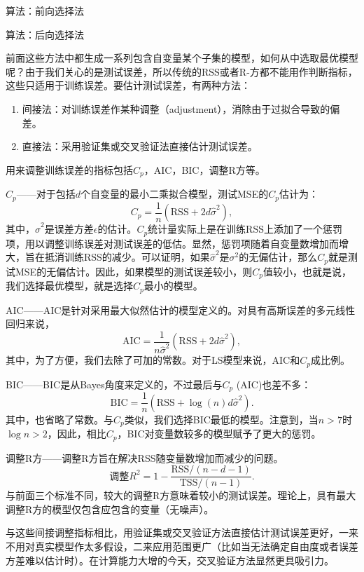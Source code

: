 \documentclass[hyperref,]{ctexart}
\providecommand{\tightlist}{%
  \setlength{\itemsep}{0pt}\setlength{\parskip}{0pt}}
\begin{document}
算法：前向选择法

算法：后向选择法

前面这些方法中都生成一系列包含自变量某个子集的模型，如何从中选取最优模型呢？由于我们关心的是测试误差，所以传统的RSS或者R-方都不能用作判断指标，这些只适用于训练误差。要估计测试误差，有两种方法：

\begin{enumerate}
\def\labelenumi{\arabic{enumi}.}
\tightlist
\item
  间接法：对训练误差作某种调整（adjustment），消除由于过拟合导致的偏差。
\item
  直接法：采用验证集或交叉验证法直接估计测试误差。
\end{enumerate}

用来调整训练误差的指标包括\(C_p\)，AIC，BIC，调整R方等。

\(C_p\)------对于包括\(d\)个自变量的最小二乘拟合模型，测试MSE的\(C_p\)估计为：
\[C_p=\frac{1}{n}\left(\mathrm{RSS}+2d\hat{\sigma}^2\right),\]
其中，\(\hat{\sigma}^2\)是误差方差\(\epsilon\)的估计。\(C_p\)统计量实际上是在训练RSS上添加了一个惩罚项，用以调整训练误差对测试误差的低估。显然，惩罚项随着自变量数增加而增大，旨在抵消训练RSS的减少。可以证明，如果\(\hat{\sigma}^2\)是\(\sigma^2\)的无偏估计，那么\(C_p\)就是测试MSE的无偏估计。因此，如果模型的测试误差较小，则\(C_p\)值较小，也就是说，我们选择最优模型，就是选择\(C_p\)最小的模型。

AIC------AIC是针对采用最大似然估计的模型定义的。对具有高斯误差的多元线性回归来说，
\[\mathrm{AIC}= \frac{1}{n\hat{\sigma}^2}\left(\mathrm{RSS}+2d\hat{\sigma}^2\right),\]
其中，为了方便，我们去除了可加的常数。对于LS模型来说，AIC和\(C_p\)成比例。

BIC------BIC是从Bayes角度来定义的，不过最后与\(C_p\) (AIC)也差不多：
\[\mathrm{BIC}=\frac{1}{n}\left(\mathrm{RSS}+\log(n)d\hat{\sigma}^2\right).\]
其中，也省略了常数。与\(C_p\)类似，我们选择BIC最低的模型。注意到，当\(n>7\)时\(\log n>2\)，因此，相比\(C_p\)，BIC对变量数较多的模型赋予了更大的惩罚。

调整R方------调整R方旨在解决RSS随变量数增加而减少的问题。
\[\mathrm{调整} R^2 = 1 - \frac{\mathrm{RSS}/(n-d-1)}{\mathrm{TSS}/(n-1)}.\]
与前面三个标准不同，较大的调整R方意味着较小的测试误差。理论上，具有最大调整R方的模型仅包含应包含的变量（无噪声）。

与这些间接调整指标相比，用验证集或交叉验证方法直接估计测试误差更好，一来不用对真实模型作太多假设，二来应用范围更广（比如当无法确定自由度或者误差方差难以估计时）。在计算能力大增的今天，交叉验证方法显然更具吸引力。
\end{document}
